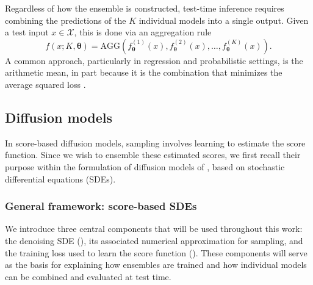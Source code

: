 \documentclass[10pt]{article} %
\def\vtheta{{\bm{\theta}}}
\begin{document}
Regardless of how the ensemble is constructed, test-time inference requires combining the predictions of the $K$ individual models into a single output. Given a test input $x \in \mathcal{X}$, this is done via an aggregation rule
\begin{equation}
f(x;K,\vtheta) = \text{AGG}\left( f^{(1)}_\vtheta(x), f_\vtheta^{(2)}(x), \dots, f_\vtheta^{(K)}(x) \right).
\end{equation} 
A common approach, particularly in regression and probabilistic settings, is the arithmetic mean, in part because it is the combination that minimizes the average squared loss  \citep{wood2023unified}.

\subsection{Diffusion models}

In score-based diffusion models, sampling involves learning to estimate the score function.
Since we wish to ensemble these estimated scores, we first recall their purpose within the formulation of diffusion models of \citet{song2021scorebasedgenerativemodelingstochastic}, based on stochastic differential equations (SDEs).

\subsubsection{General framework: score-based SDEs}\label{section: general framework diffusion models}

We introduce three central components that will be used throughout this work:  the denoising SDE (), its associated numerical approximation for sampling, and the training loss used to learn the score function (). These components will serve as the basis for explaining how ensembles are trained and how individual models can be combined and evaluated at test time.
\end{document}
